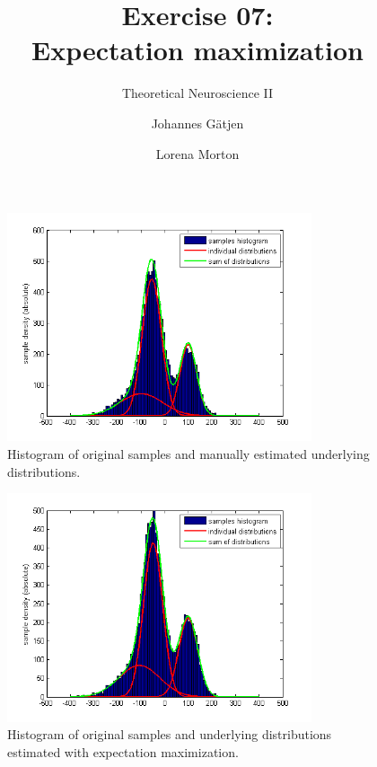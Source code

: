 \documentclass{scrartcl}
\title{Exercise 07:\\Expectation maximization}
\subtitle{Theoretical Neuroscience II}
\author{Johannes G\"atjen \and Lorena Morton}
\begin{document}
\maketitle


\begin{figure}[h]
\centering
\includegraphics[trim = {0.7cm 0.5cm 1cm 0.7cm}, width=0.8\textwidth, clip]{../pics/manual}
\caption{Histogram of original samples and manually estimated underlying distributions.}
\label{}
\end{figure}

\begin{figure}[h]
\centering
\includegraphics[trim = {0.7cm 0.5cm 1cm 0.7cm}, width=0.8\textwidth, clip]{../pics/em}
\caption{Histogram of original samples and underlying distributions estimated with expectation maximization.}
\label{}
\end{figure}
\end{document}
